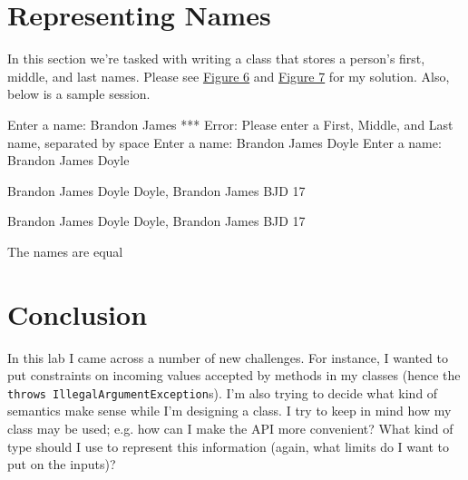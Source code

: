 \documentclass[leqno, 11pt]{article}
\newcommand{\iftcodefigure}[3]{%
  \begin{codefigure}
    \label{#1}
    \addtocounter{figure}{-1}
    
  \end{codefigure}
}
\begin{document}
\section{Representing Names}
In this section we're tasked with writing a class that stores a person's first, middle, and last names. Please see \hyperref[fig:six]{Figure 6} and \hyperref[fig:seven]{Figure 7} for my solution. Also, below is a sample session.
\begin{verbbox}[\mbox{}\scriptsize]
Enter a name: Brandon James
*** Error: Please enter a First, Middle, and Last name, separated by space
Enter a name: Brandon James       Doyle
Enter a name: Brandon James Doyle

Brandon James Doyle
Doyle, Brandon James
BJD
17

Brandon James Doyle
Doyle, Brandon James
BJD
17

The names are equal
\end{verbbox}
\begin{center}
  \theverbbox
\end{center}
\iftcodefigure{fig:six}{Name.java}{%
  /home/brandon/eclipse-workspace/ift_194_labs/src/lab_3/Name.java}
\iftcodefigure{fig:seven}{TestNames.java}{%
  /home/brandon/eclipse-workspace/ift_194_labs/src/lab_3/TestNames.java}
\section{Conclusion}
In this lab I came across a number of new challenges. For instance, I wanted to put constraints on incoming values accepted by methods in my classes (hence the \texttt{throws IllegalArgumentException}s). I'm also trying to decide what kind of semantics make sense while I'm designing a class. I try to keep in mind how my class may be used; e.g. how can I make the API more convenient? What kind of type should I use to represent this information (again, what limits do I want to put on the inputs)?
\end{document}
